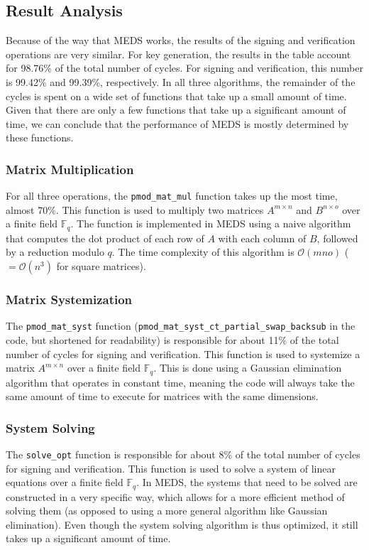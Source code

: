 \documentclass[11pt,a4paper]{report}
\theoremstyle{definition}
\begin{document}
\subsection{Result Analysis}
Because of the way that MEDS works, the results of the signing and verification operations are very similar. For key generation, the results in the table account for 98.76\% of the total number of cycles. For signing and verification, this number is 99.42\% and 99.39\%, respectively. In all three algorithms, the remainder of the cycles is spent on a wide set of functions that take up a small amount of time. Given that there are only a few functions that take up a significant amount of time, we can conclude that the performance of MEDS is mostly determined by these functions.

\subsubsection{Matrix Multiplication}
For all three operations, the \texttt{pmod\_mat\_mul} function takes up the most time, almost 70\%. This function is used to multiply two matrices $A^{m \times n}$ and $B^{n \times o}$ over a finite field $\mathbb{F}_q$. The function is implemented in MEDS using a naive algorithm that computes the dot product of each row of $A$ with each column of $B$, followed by a reduction modulo $q$. The time complexity of this algorithm is $\mathcal{O}(mno)$ ($= \mathcal{O}(n^3)$ for square matrices).

\subsubsection{Matrix Systemization}
The \texttt{pmod\_mat\_syst} function (\texttt{pmod\_mat\_syst\_ct\_partial\_swap\_backsub} in the code, but shortened for readability) is responsible for about 11\% of the total number of cycles for signing and verification. This function is used to systemize a matrix $A^{m \times n}$ over a finite field $\mathbb{F}_q$. This is done using a Gaussian elimination algorithm that operates in constant time, meaning the code will always take the same amount of time to execute for matrices with the same dimensions.


\subsubsection{System Solving}
The \texttt{solve\_opt} function is responsible for about 8\% of the total number of cycles for signing and verification. This function is used to solve a system of linear equations over a finite field $\mathbb{F}_q$. In MEDS, the systems that need to be solved are constructed in a very specific way, which allows for a more efficient method of solving them (as opposed to using a more general algorithm like Gaussian elimination). Even though the system solving algorithm is thus optimized, it still takes up a significant amount of time.
\end{document}
